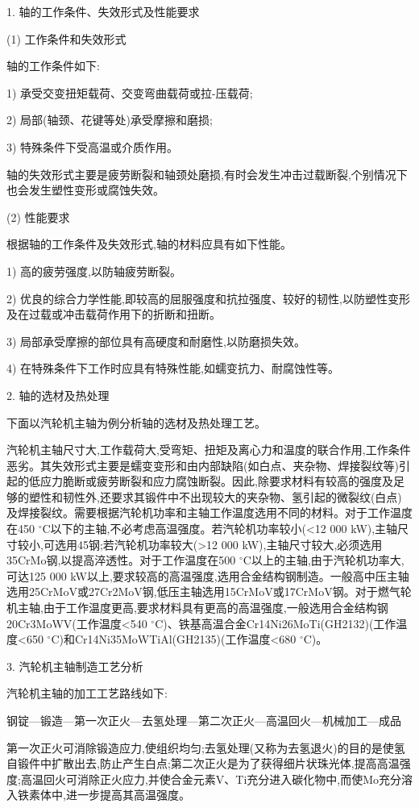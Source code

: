 \documentclass[UTF8]{ctexbook}
\newcommand{\◎}{\ensuremath{\bigcirc}}
\begin{document}
1. 轴的工作条件、失效形式及性能要求

(1) 工作条件和失效形式

轴的工作条件如下:

1) 承受交变扭矩载荷、交变弯曲载荷或拉-压载荷;

2) 局部(轴颈、花键等处)承受摩擦和磨损;

3) 特殊条件下受高温或介质作用。

轴的失效形式主要是疲劳断裂和轴颈处磨损,有时会发生冲击过载断裂,个别情况下也会发生塑性变形或腐蚀失效。

(2) 性能要求

根据轴的工作条件及失效形式,轴的材料应具有如下性能。

1) 高的疲劳强度,以防轴疲劳断裂。

2) 优良的综合力学性能,即较高的屈服强度和抗拉强度、较好的韧性,以防塑性变形及在过载或冲击载荷作用下的折断和扭断。

3) 局部承受摩擦的部位具有高硬度和耐磨性,以防磨损失效。

4) 在特殊条件下工作时应具有特殊性能,如蠕变抗力、耐腐蚀性等。

2. 轴的选材及热处理

下面以汽轮机主轴为例分析轴的选材及热处理工艺。

汽轮机主轴尺寸大,工作载荷大,受弯矩、扭矩及离心力和温度的联合作用,工作条件恶劣。其失效形式主要是蠕变变形和由内部缺陷(如白点、夹杂物、焊接裂纹等)引起的低应力脆断或疲劳断裂和应力腐蚀断裂。因此,除要求材料有较高的强度及足够的塑性和韧性外,还要求其锻件中不出现较大的夹杂物、氢引起的微裂纹(白点)及焊接裂纹。需要根据汽轮机功率和主轴工作温度选用不同的材料。对于工作温度在450 $^\circ$C以下的主轴,不必考虑高温强度。若汽轮机功率较小(<12 000 kW),主轴尺寸较小,可选用45钢;若汽轮机功率较大(>12 000 kW),主轴尺寸较大,必须选用35CrMo钢,以提高淬透性。对于工作温度在500 $^\circ$C以上的主轴,由于汽轮机功率大,可达125 000 kW以上,要求较高的高温强度,选用合金结构钢制造。一般高中压主轴选用25CrMoV或27Cr2MoV钢,低压主轴选用15CrMoV或17CrMoV钢。对于燃气轮机主轴,由于工作温度更高,要求材料具有更高的高温强度,一般选用合金结构钢20Cr3MoWV(工作温度<540 $^\circ$C)、铁基高温合金Cr14Ni26MoTi(GH2132)(工作温度<650 $^\circ$C)和Cr14Ni35MoWTiAl(GH2135)(工作温度<680 $^\circ$C)。

3. 汽轮机主轴制造工艺分析

汽轮机主轴的加工工艺路线如下:

钢锭—锻造—第一次正火—去氢处理—第二次正火—高温回火—机械加工—成品

第一次正火可消除锻造应力,使组织均匀;去氢处理(又称为去氢退火)的目的是使氢自锻件中扩散出去,防止产生白点;第二次正火是为了获得细片状珠光体,提高高温强度;高温回火可消除正火应力,并使合金元素V、Ti充分进入碳化物中,而使Mo充分溶入铁素体中,进一步提高其高温强度。
\end{document}
